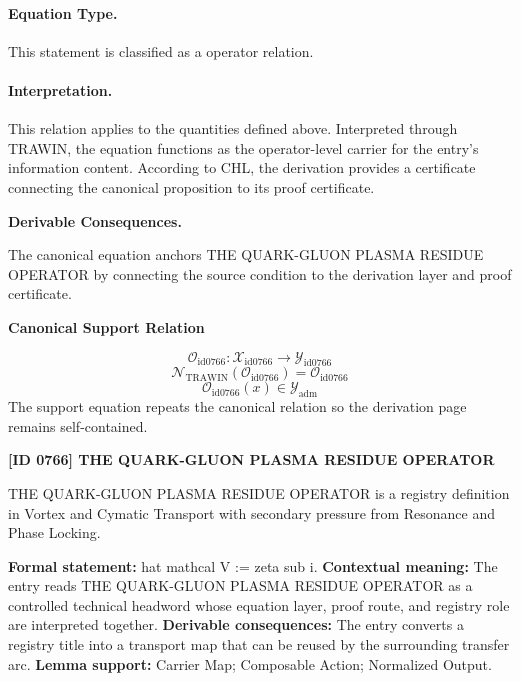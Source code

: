 \paragraph{Equation Type.}
This statement is classified as a operator relation.

\paragraph{Interpretation.}
This relation applies to the quantities defined above. Interpreted through TRAWIN, the equation functions as the operator-level carrier for the entry’s information content. According to CHL, the derivation provides a certificate connecting the canonical proposition to its proof certificate.

\par\vspace{0.35em}
\noindent\textbf{Derivable Consequences.}\quad
\begingroup
\footnotesize
\raggedright
The canonical equation anchors THE QUARK-GLUON PLASMA RESIDUE OPERATOR by connecting the source condition to the derivation layer and proof certificate.
\par\endgroup

\noindent\textbf{Canonical Support Relation}\par
\[
\mathcal{O}_{\mathrm{id0766}}:\mathcal{X}_{\mathrm{id0766}}\longrightarrow\mathcal{Y}_{\mathrm{id0766}}
\]
\[
\mathcal{N}_{\mathrm{TRAWIN}}(\mathcal{O}_{\mathrm{id0766}})=\mathcal{O}_{\mathrm{id0766}}
\]
\[
\mathcal{O}_{\mathrm{id0766}}(x)\in\mathcal{Y}_{\mathrm{adm}}
\]
\noindent The support equation repeats the canonical relation so the derivation page remains self-contained.\par

\clearpage
\noindent\textbf{[ID 0766] THE QUARK-GLUON PLASMA RESIDUE OPERATOR}\par
\vspace{0.35em}
\begingroup\small
{}
THE QUARK-GLUON PLASMA RESIDUE OPERATOR is a registry definition in Vortex and Cymatic Transport with secondary pressure from Resonance and Phase Locking.

\begingroup\footnotesize\setlength{\emergencystretch}{3em}\sloppy
\textbf{Formal statement:} hat mathcal V := zeta sub i. \textbf{Contextual meaning:} The entry reads THE QUARK-GLUON PLASMA RESIDUE OPERATOR as a controlled technical headword whose equation layer, proof route, and registry role are interpreted together. \textbf{Derivable consequences:} The entry converts a registry title into a transport map that can be reused by the surrounding transfer arc. \textbf{Lemma support:} Carrier Map; Composable Action; Normalized Output.\par
\endgroup

